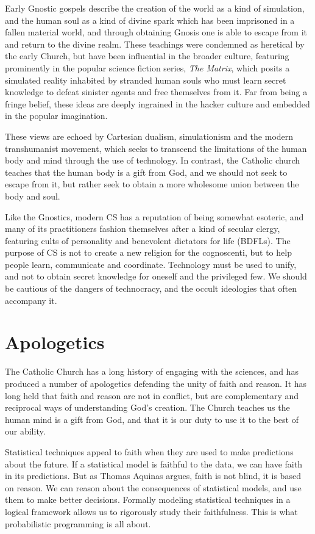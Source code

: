 \documentclass[sigplan,nonacm]{acmart}\settopmatter{printfolios=false,printccs=false,printacmref=false}
\begin{document}
  Early Gnostic gospels describe the creation of the world as a kind of simulation, and the human soul as a kind of divine spark which has been imprisoned in a fallen material world, and through obtaining Gnosis one is able to escape from it and return to the divine realm. These teachings were condemned as heretical by the early Church, but have been influential in the broader culture, featuring prominently in the popular science fiction series, \textit{The Matrix}, which posits a simulated reality inhabited by stranded human souls who must learn secret knowledge to defeat sinister agents and free themselves from it. Far from being a fringe belief, these ideas are deeply ingrained in the hacker culture and embedded in the popular imagination.

  These views are echoed by Cartesian dualism, simulationism and the modern transhumanist movement, which seeks to transcend the limitations of the human body and mind through the use of technology. In contrast, the Catholic church teaches that the human body is a gift from God, and we should not seek to escape from it, but rather seek to obtain a more wholesome union between the body and soul.

  Like the Gnostics, modern CS has a reputation of being somewhat esoteric, and many of its practitioners fashion themselves after a kind of secular clergy, featuring cults of personality and benevolent dictators for life (BDFLs). The purpose of CS is not to create a new religion for the cognoscenti, but to help people learn, communicate and coordinate. Technology must be used to unify, and not to obtain secret knowledge for oneself and the privileged few. We should be cautious of the dangers of technocracy, and the occult ideologies that often accompany it.

  \section{Apologetics}

  The Catholic Church has a long history of engaging with the sciences, and has produced a number of apologetics defending the unity of faith and reason. It has long held that faith and reason are not in conflict, but are complementary and reciprocal ways of understanding God's creation. The Church teaches us the human mind is a gift from God, and that it is our duty to use it to the best of our ability.

  Statistical techniques appeal to faith when they are used to make predictions about the future. If a statistical model is faithful to the data, we can have faith in its predictions. But as Thomas Aquinas argues, faith is not blind, it is based on reason. We can reason about the consequences of statistical models, and use them to make better decisions. Formally modeling statistical techniques in a logical framework allows us to rigorously study their faithfulness. This is what probabilistic programming is all about.
\end{document}
